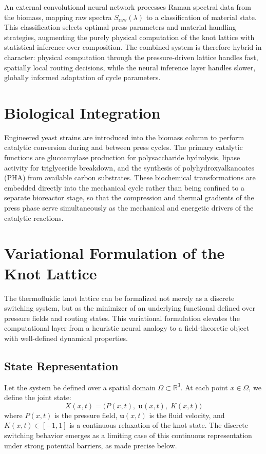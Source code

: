 \documentclass[12pt, a4paper]{article}
\begin{document}
An external convolutional neural network processes Raman spectral data from the biomass, mapping raw spectra $S_{\text{raw}}(\lambda)$ to a classification of material state. This classification selects optimal press parameters and material handling strategies, augmenting the purely physical computation of the knot lattice with statistical inference over composition. The combined system is therefore hybrid in character: physical computation through the pressure-driven lattice handles fast, spatially local routing decisions, while the neural inference layer handles slower, globally informed adaptation of cycle parameters.

\section{Biological Integration}

Engineered yeast strains are introduced into the biomass column to perform catalytic conversion during and between press cycles. The primary catalytic functions are glucoamylase production for polysaccharide hydrolysis, lipase activity for triglyceride breakdown, and the synthesis of polyhydroxyalkanoates (PHA) from available carbon substrates. These biochemical transformations are embedded directly into the mechanical cycle rather than being confined to a separate bioreactor stage, so that the compression and thermal gradients of the press phase serve simultaneously as the mechanical and energetic drivers of the catalytic reactions.

\section{Variational Formulation of the Knot Lattice}

The thermofluidic knot lattice can be formalized not merely as a discrete switching system, but as the minimizer of an underlying functional defined over pressure fields and routing states. This variational formulation elevates the computational layer from a heuristic neural analogy to a field-theoretic object with well-defined dynamical properties.

\subsection{State Representation}

Let the system be defined over a spatial domain $\Omega \subset \mathbb{R}^3$. At each point $x \in \Omega$, we define the joint state:
\[
X(x,t) = \bigl(P(x,t),\;\mathbf{u}(x,t),\;K(x,t)\bigr)
\]
where $P(x,t)$ is the pressure field, $\mathbf{u}(x,t)$ is the fluid velocity, and $K(x,t) \in [-1,1]$ is a continuous relaxation of the knot state. The discrete switching behavior emerges as a limiting case of this continuous representation under strong potential barriers, as made precise below.
\end{document}

